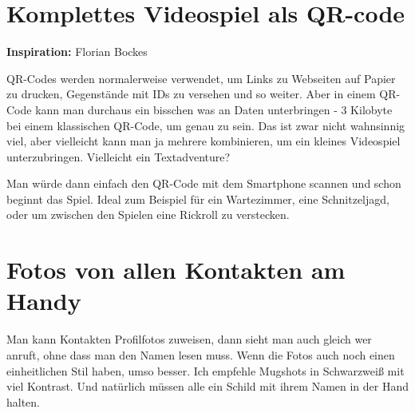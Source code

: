 \documentclass[a5paper,pagesize,10pt,bibtotoc,pointlessnumbers,normalheadings,DIV=9,twoside=false]{scrbook}
\newcommand{\attribution}[1]{
    \textbf{Inspiration:} #1
}
\begin{document}



\chapter{Komplettes Videospiel als QR-code}
\attribution{Florian Bockes}

QR-Codes werden normalerweise verwendet, um Links zu Webseiten auf Papier zu drucken, Gegenstände mit IDs zu versehen und so weiter.
Aber in einem QR-Code kann man durchaus ein bisschen was an Daten unterbringen - 3 Kilobyte bei einem klassischen QR-Code, um genau zu sein.
Das ist zwar nicht wahnsinnig viel, aber vielleicht kann man ja mehrere kombinieren, um ein kleines Videospiel unterzubringen.
Vielleicht ein Textadventure?

Man würde dann einfach den QR-Code mit dem Smartphone scannen und schon beginnt das Spiel.
Ideal zum Beispiel für ein Wartezimmer, eine Schnitzeljagd, oder um zwischen den Spielen eine Rickroll zu verstecken.


\chapter{Fotos von allen Kontakten am Handy}

Man kann Kontakten Profilfotos zuweisen, dann sieht man auch gleich wer anruft, ohne dass man den Namen lesen muss.
Wenn die Fotos auch noch einen einheitlichen Stil haben, umso besser.
Ich empfehle Mugshots in Schwarzweiß mit viel Kontrast.
Und natürlich müssen alle ein Schild mit ihrem Namen in der Hand halten.
\end{document}

